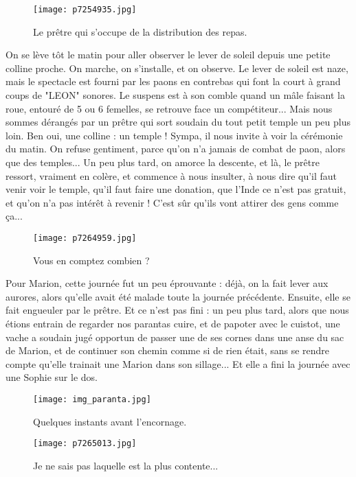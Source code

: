 \documentclass{book}
\begin{document}
\begin{figure}[h]
\centering
\texttt{[image: p7254935.jpg]}
\caption*{Le prêtre qui s'occupe de la distribution des repas.}
\end{figure}

On se lève tôt le matin pour aller observer le lever de soleil depuis une petite colline proche. On marche, on s'installe, et on observe. Le lever de soleil est naze, mais le spectacle est fourni par les paons en contrebas qui font la court à grand coups de "LEON" sonores. Le suspens est à son comble quand un mâle faisant la roue, entouré de 5 ou 6 femelles, se retrouve face un compétiteur... Mais nous sommes dérangés par un prêtre qui sort soudain du tout petit temple un peu plus loin. Ben oui, une colline : un temple ! Sympa, il nous invite à voir la cérémonie du matin. On refuse gentiment, parce qu'on n'a jamais de combat de paon, alors que des temples... Un peu plus tard, on amorce la descente, et là, le prêtre ressort, vraiment en colère, et commence à nous insulter, à nous dire qu'il faut venir voir le temple, qu'il faut faire une donation, que l'Inde ce n'est pas gratuit, et qu'on n'a pas intérêt à revenir ! C'est sûr qu'ils vont attirer des gens comme ça...


\begin{figure}[h]
\centering
\texttt{[image: p7264959.jpg]}
\caption*{Vous en comptez combien ?}
\end{figure}

Pour Marion, cette journée fut un peu éprouvante : déjà, on la fait lever aux aurores, alors qu'elle avait été malade toute la journée précédente. Ensuite, elle se fait engueuler par le prêtre. Et ce n'est pas fini : un peu plus tard, alors que nous étions entrain de regarder nos parantas cuire, et de papoter avec le cuistot, une vache a soudain jugé opportun de passer une de ses cornes dans une anse du sac de Marion, et de continuer son chemin comme si de rien était, sans se rendre compte qu'elle trainait une Marion dans son sillage... Et elle a fini la journée avec une Sophie sur le dos.


\begin{figure}[h]
\centering
\texttt{[image: img\_paranta.jpg]}
\caption*{Quelques instants avant l'encornage.}
\end{figure}


\begin{figure}[h]
\centering
\texttt{[image: p7265013.jpg]}
\caption*{Je ne sais pas laquelle est la plus contente...}
\end{figure}
\end{document}
